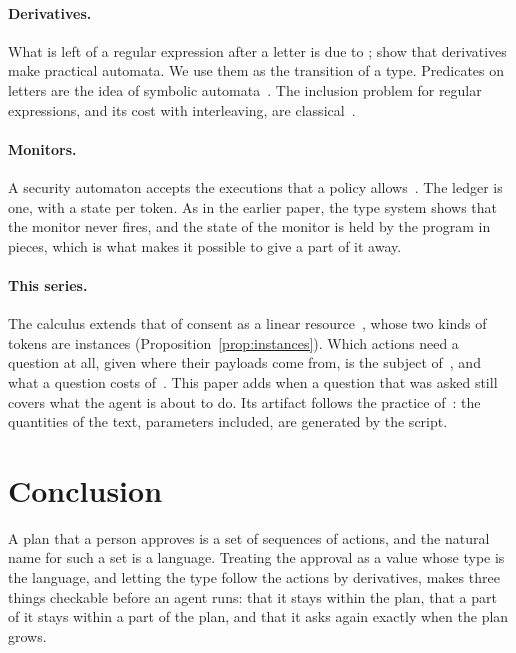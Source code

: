 \documentclass[acmsmall,nonacm,screen]{acmart}
\begin{document}
\paragraph{Derivatives.} What is left of a regular expression after a letter is due to
\citet{brzozowski1964}; \citet{owens2009} show that derivatives make practical automata.
We use them as the transition of a type. Predicates on letters are the idea of symbolic
automata~\citep{dantoni2017}. The inclusion problem for regular expressions, and its cost
with interleaving, are classical~\citep{stockmeyer1973,mayer1994}.

\paragraph{Monitors.} A security automaton accepts the executions that a policy
allows~\citep{schneider2000}. The ledger is one, with a state per token. As in the earlier
paper, the type system shows that the monitor never fires, and the state of the monitor is
held by the program in pieces, which is what makes it possible to give a part of it away.

\paragraph{This series.} The calculus extends that of consent as a linear
resource~\citep{tpp4}, whose two kinds of tokens are instances
(Proposition~\ref{prop:instances}). Which actions need a question at all, given where their
payloads come from, is the subject of~\citet{tpp7}, and what a question costs
of~\citet{tpp6}. This paper adds when a question that was asked still covers what the agent
is about to do. Its artifact follows the practice of~\citet{tpp10}: the quantities of the
text, parameters included, are generated by the script.

\section{Conclusion}

A plan that a person approves is a set of sequences of actions, and the natural name for
such a set is a language. Treating the approval as a value whose type is the language, and
letting the type follow the actions by derivatives, makes three things checkable before an
agent runs: that it stays within the plan, that a part of it stays within a part of the
plan, and that it asks again exactly when the plan grows.



\end{document}
